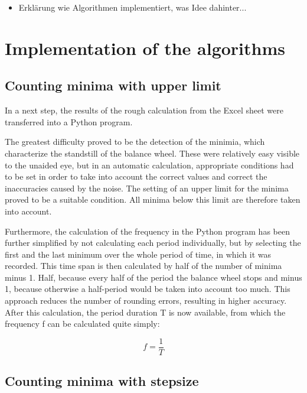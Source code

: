 \documentclass[12pt, a4paper]{report}
\begin{document}
    \begin{itemize}
    \item Erklärung wie Algorithmen implementiert, was Idee dahinter...
    \end{itemize}
    
    \section{Implementation of the algorithms}
    \subsection{Counting minima with upper limit}
    
    In a next step, the results of the rough calculation from the Excel sheet were transferred into a Python program. 
    
    The greatest difficulty proved to be the detection of the minimia, which characterize the standstill of the balance wheel. These were relatively easy visible to the unaided eye, but in an automatic calculation, appropriate conditions had to be set in order to take into account the correct values and correct the inaccuracies caused by the noise. The setting of an upper limit for the minima proved to be a suitable condition. All minima below this limit are therefore taken into account. 
    
    Furthermore, the calculation of the frequency in the Python program has been further simplified by not calculating each period individually, but by selecting the first and the last minimum over the whole period of time, in which it was recorded. This time span is then calculated by half of the number of minima minus 1. Half, because every half of the period the balance wheel stops and minus 1, because otherwise a half-period would be taken into account too much. This approach reduces the number of rounding errors, resulting in higher accuracy. After this calculation, the period duration T is now available, from which the frequency f can be calculated quite simply: 
    
     \begin{displaymath}
      f = \frac{1}{T}
     \end{displaymath}
     
  \subsection{Counting minima with stepsize}
  
\end{document}
